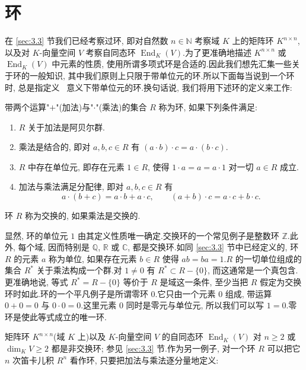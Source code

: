 \section{环}\label{sec:5.1}

在 \ref{sec:3.3} 节我们已经考察过环, 即对自然数 $n \in \mathbb{N}$ 考察域 $K$ 上的矩阵环 $K^{n \times n}$, 以及对 $K$-向量空间 $V$ 考察自同态环 $\operatorname{End}_K(V)$.为了更准确地描述 $K^{n \times n}$ 或 $\operatorname{End}_K(V)$ 中元素的性质, 使用所谓多项式环是合适的.因此我们想先汇集一些关于环的一般知识, 其中我们原则上只限于带单位元的环.所以下面每当说到一个环时, 总是指定义~ 意义下带单位元的环.换句话说, 我们将用下述环的定义来工作:

\begin{definition}[环]\label{def:5.1.1}
带两个运算"$+$"(加法)与"$\cdot$"(乘法)的集合 $R$ 称为环, 如果下列条件满足:
\begin{enumerate}
\item[(i)] $R$ 关于加法是阿贝尔群.
\item[(ii)] 乘法是结合的, 即对 $a, b, c \in R$ 有 $(a \cdot b) \cdot c = a \cdot (b \cdot c)$.
\item[(iii)] $R$ 中存在单位元, 即存在元素 $1 \in R$, 使得 $1 \cdot a = a = a \cdot 1$ 对一切 $a \in R$ 成立.
\item[(iv)] 加法与乘法满足分配律, 即对 $a, b, c \in R$ 有
\[
a \cdot (b + c) = a \cdot b + a \cdot c, \qquad (a + b) \cdot c = a \cdot c + b \cdot c\text{.}
\]
\end{enumerate}
\end{definition}

环 $R$ 称为交换的, 如果乘法是交换的.

显然, 环的单位元 $1$ 由其定义性质唯一确定.交换环的一个常见例子是整数环 $\mathbb{Z}$.此外, 每个域, 因而特别是 $\mathbb{Q}$, $\mathbb{R}$ 或 $\mathbb{C}$, 都是交换环.如同 \ref{sec:3.3} 节中已经定义的, 环 $R$ 的元素 $a$ 称为单位, 如果存在元素 $b \in R$ 使得 $ab = ba = 1$.$R$ 的一切单位组成的集合 $R^*$ 关于乘法构成一个群.对 $1 \neq 0$ 有 $R^* \subset R - \{0\}$, 而这通常是一个真包含.更准确地说, 等式 $R^* = R - \{0\}$ 等价于 $R$ 是域这一条件, 至少当把 $R$ 假定为交换环时如此.环的一个平凡例子是所谓零环 $0$.它只由一个元素 $0$ 组成, 带运算 $0 + 0 = 0$ 与 $0 \cdot 0 = 0$.这里元素 $0$ 同时是零元与单位元, 所以我们可以写 $1 = 0$.零环是使此等式成立的唯一环.

矩阵环 $K^{n \times n}$(域 $K$ 上)以及 $K$-向量空间 $V$ 的自同态环 $\operatorname{End}_K(V)$ 对 $n \geq 2$ 或 $\dim_K V \geq 2$ 都是非交换环; 参见 \ref{sec:3.3} 节.作为另一例子, 对一个环 $R$ 可以把它 $n$ 次笛卡儿积 $R^n$ 看作环, 只要把加法与乘法逐分量地定义:

